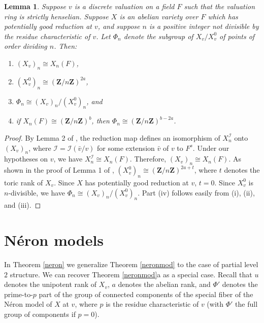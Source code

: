 \documentclass{amsart}
\def\Z{{\mathbf Z}}
\def\I{{\mathcal I}}
\newtheorem{lem}[thm]{Lemma}
\theoremstyle{definition}
\begin{document}
\begin{lem}
\label{neronlemma}
Suppose 
$v$ is a discrete valuation on a field $F$ such that 
the valuation ring is strictly henselian.
Suppose $X$ is an abelian 
variety over $F$ which has potentially good reduction at $v$,
and 
suppose $n$ is a positive integer not divisible by the residue
characteristic of $v$.
Let $\Phi_n$ denote the subgroup of 
$X_v/X_v^0$ of points of order dividing $n$.  
Then:
\begin{enumerate}
\item[(i)] $(X_v)_n \cong X_n(F)$,
\item[(ii)] $(X_v^0)_n \cong (\Z/n\Z)^{2a}$,  
\item[(iii)] $\Phi_n \cong (X_v)_n/(X_v^0)_n$,  and
\item[(iv)] if $X_n(F) \cong (\Z/n\Z)^{b}$,   
then $\Phi_n \cong (\Z/n\Z)^{b-2a}$.
\end{enumerate}
\end{lem}

\begin{proof}
By Lemma 2 of \cite{Serre-Tate}, the reduction map defines
an isomorphism of $X_n^\I$ onto $(X_v)_n$,
where $\I = \I({\bar v}/v)$ for some extension ${\bar v}$
of $v$ to $F^s$. 
Under our hypotheses on $v$, we have
$X_n^\I \cong X_n(F)$. Therefore, 
$(X_v)_n \cong X_n(F)$.
As shown in the proof of Lemma 1 of \cite{Serre-Tate},
$(X_v^0)_n \cong (\Z/n\Z)^{2a+t}$, where $t$ denotes
the toric rank of $X_v$.
Since $X$ has potentially good reduction at $v$, $t = 0$.
Since $X_v^0$ is $n$-divisible, we have 
$\Phi_n \cong (X_v)_n/(X_v^0)_n$. Part (iv) follows
easily from (i), (ii), and (iii).
\end{proof} 

\section{N\'eron models}
\label{main}

In Theorem \ref{neron} we generalize Theorem \ref{neronmod}
to the case of partial level $2$ structure. We can recover
Theorem \ref{neronmod}a as a special case. 
Recall that $u$ denotes the unipotent rank of $X_v$, 
$a$ denotes the abelian rank, and 
$\Phi '$ denotes the prime-to-$p$ part of the group of 
connected components of the special
fiber of the N\'eron model of $X$ at $v$, where $p$ is the residue 
characteristic of $v$ (with $\Phi '$ the full
group of components if $p = 0$). 
\end{document}
